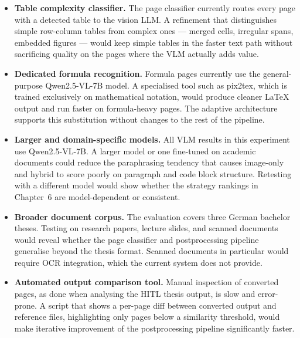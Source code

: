 \documentclass[12pt]{article}
\begin{document}
\begin{itemize}

    \item \textbf{Table complexity classifier.}
    The page classifier currently routes every page with a detected table
    to the vision LLM.
    A refinement that distinguishes simple row-column tables from complex
    ones --- merged cells, irregular spans, embedded figures --- would
    keep simple tables in the faster text path without sacrificing quality
    on the pages where the VLM actually adds value.

    \item \textbf{Dedicated formula recognition.}
    Formula pages currently use the general-purpose Qwen2.5-VL-7B model.
    A specialised tool such as pix2tex, which is trained exclusively on
    mathematical notation, would produce cleaner LaTeX output and run
    faster on formula-heavy pages.
    The adaptive architecture supports this substitution without changes
    to the rest of the pipeline.

    \item \textbf{Larger and domain-specific models.}
    All VLM results in this experiment use Qwen2.5-VL-7B.
    A larger model or one fine-tuned on academic documents could reduce
    the paraphrasing tendency that causes image-only and hybrid to score
    poorly on paragraph and code block structure.
    Retesting with a different model would show whether the strategy
    rankings in Chapter~6 are model-dependent or consistent.

    \item \textbf{Broader document corpus.}
    The evaluation covers three German bachelor theses.
    Testing on research papers, lecture slides, and scanned documents
    would reveal whether the page classifier and postprocessing pipeline
    generalise beyond the thesis format.
    Scanned documents in particular would require OCR integration, which
    the current system does not provide.

    \item \textbf{Automated output comparison tool.}
    Manual inspection of converted pages, as done when analysing the
    HITL thesis output, is slow and error-prone.
    A script that shows a per-page diff between converted output and
    reference files, highlighting only pages below a similarity
    threshold, would make iterative improvement of the postprocessing
    pipeline significantly faster.

\end{itemize}
\end{document}
